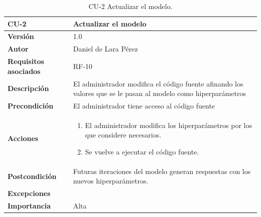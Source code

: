 \begin{table}[p]
	\centering
	\begin{tabularx}{\linewidth}{ p{} p{} }
		\toprule
		\textbf{CU-2}    & \textbf{Actualizar el modelo}\\
		\toprule
		\textbf{Versión}              & 1.0    \\
		\textbf{Autor}                & Daniel de Lara Pérez \\
		\textbf{Requisitos asociados} & RF-10 \\
		\textbf{Descripción}          & El administrador modifica el código fuente afinando los valores que se le pasan al modelo como hiperparámetros \\
		\textbf{Precondición}         & El administrador tiene acceso al código fuente \\
		\textbf{Acciones}             &
		\begin{enumerate}
			\def\labelenumi{\arabic{enumi}.}
			\tightlist
			\item El administrador modifica los hiperparámetros por los que considere necesarios.
            \item Se vuelve a ejecutar el código fuente.
         
		\end{enumerate}\\
		\textbf{Postcondición}        & Futuras iteraciones del modelo generan respuestas con los nuevos hiperparámetros. \\
		\textbf{Excepciones}          &  \\
		\textbf{Importancia}          & Alta\\
		\bottomrule
	\end{tabularx}
	\caption{CU-2 Actualizar el modelo.}
\end{table}

